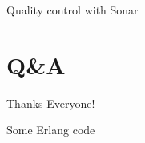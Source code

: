 \documentclass[pdf]{beamer}
\begin{document}
\begin{frame}{Quality control with Sonar}
\end{frame}

\section{Q\&A}

\begin{frame}{Thanks Everyone!}
\end{frame}





\begin{frame}{Some Erlang code}
    
\end{frame}
\end{document}
